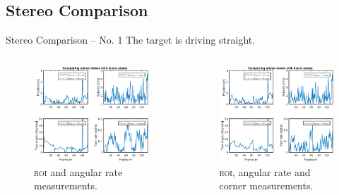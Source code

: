 \documentclass{beamer}
\newcommand{\roi}{\textsc{roi}\xspace}
\begin{document}
\subsection{Stereo Comparison}

\begin{frame}{Stereo Comparison -- No. 1}
	The target is driving straight.
	\begin{columns}[T]
	\begin{figure}
		\includegraphics[width=\textwidth]{Stereo/155532_RoiAngVel_gate_klt}
		\caption{\roi and angular rate measurements.}
	\end{figure}
	\begin{figure}
		\includegraphics[width=\textwidth]{Stereo/155532_AllMeasurements_gate_klt}
		\caption{\roi, angular rate and corner measurements.}
	\end{figure}
	\end{columns}
\end{frame}
\end{document}
